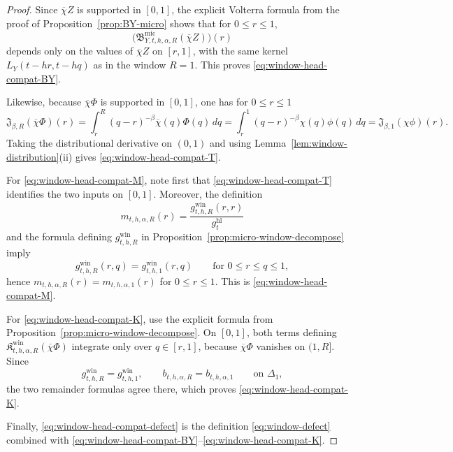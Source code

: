 \documentclass[11pt,a4paper]{amsart}
\theoremstyle{plain}
\theoremstyle{definition}
\theoremstyle{remark}
\begin{document}
\begin{proof}
Since \(\overline\chi Z\) is supported in \([0,1]\), the explicit Volterra formula from the proof of
Proposition~\ref{prop:BY-micro} shows that for \(0\le r\le1\),
\[
\bigl(
\mathfrak B_{Y,t,h,\alpha,R}^{\mathrm{mic}}(\overline\chi Z)
\bigr)(r)
\]
depends only on the values of \(\overline\chi Z\) on \([r,1]\), with the same kernel
\(L_Y(t-hr,t-hq)\) as in the window \(R=1\). This proves
\eqref{eq:window-head-compat-BY}.

Likewise, because \(\overline\chi\Phi\) is supported in \([0,1]\), one has for \(0\le r\le1\)
\[
\mathfrak J_{\beta,R}(\overline\chi\Phi)(r)
=
\int_r^R (q-r)^{-\beta}\overline\chi(q)\Phi(q)\,dq
=
\int_r^1 (q-r)^{-\beta}\chi(q)\phi(q)\,dq
=
\mathfrak J_{\beta,1}(\chi\phi)(r).
\]
Taking the distributional derivative on \((0,1)\) and using
Lemma~\ref{lem:window-distribution}(ii) gives \eqref{eq:window-head-compat-T}.

For \eqref{eq:window-head-compat-M}, note first that \eqref{eq:window-head-compat-T} identifies the
two inputs on \([0,1]\). Moreover, the definition
\[
m_{t,h,\alpha,R}(r)=\frac{g_{t,h,R}^{\mathrm{win}}(r,r)}{g_t^{\mathrm{hl}}}
\]
and the formula defining \(g_{t,h,R}^{\mathrm{win}}\) in
Proposition~\ref{prop:micro-window-decompose} imply
\[
g_{t,h,R}^{\mathrm{win}}(r,q)=g_{t,h,1}^{\mathrm{win}}(r,q)
\qquad
\text{for }0\le r\le q\le1,
\]
hence \(m_{t,h,\alpha,R}(r)=m_{t,h,\alpha,1}(r)\) for \(0\le r\le1\). This is
\eqref{eq:window-head-compat-M}.

For \eqref{eq:window-head-compat-K}, use the explicit formula from
Proposition~\ref{prop:micro-window-decompose}. On \([0,1]\), both terms defining
\(\mathfrak K_{t,h,\alpha,R}^{\mathrm{win}}(\overline\chi\Phi)\) integrate only over \(q\in[r,1]\),
because \(\overline\chi\Phi\) vanishes on \((1,R]\). Since
\[
g_{t,h,R}^{\mathrm{win}}=g_{t,h,1}^{\mathrm{win}},
\qquad
b_{t,h,\alpha,R}=b_{t,h,\alpha,1}
\qquad
\text{on }\Delta_1,
\]
the two remainder formulas agree there, which proves \eqref{eq:window-head-compat-K}.

Finally, \eqref{eq:window-head-compat-defect} is the definition \eqref{eq:window-defect}
combined with \eqref{eq:window-head-compat-BY}--\eqref{eq:window-head-compat-K}.
\end{proof}
\end{document}
